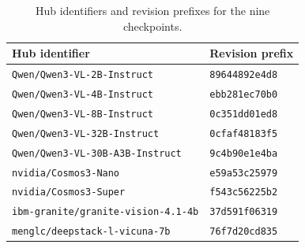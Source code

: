 \begin{table}[!htb]
\centering\footnotesize
\setlength{\tabcolsep}{3pt}
\caption{Hub identifiers and revision prefixes for the nine checkpoints.}
\begin{tabular}{@{}ll@{}}
\toprule
\rowcolor{DSTableHeader}
Hub identifier & Revision prefix \\
\midrule
\texttt{Qwen/Qwen3-VL-2B-Instruct} & \texttt{89644892e4d8} \\
\texttt{Qwen/Qwen3-VL-4B-Instruct} & \texttt{ebb281ec70b0} \\
\texttt{Qwen/Qwen3-VL-8B-Instruct} & \texttt{0c351dd01ed8} \\
\texttt{Qwen/Qwen3-VL-32B-Instruct} & \texttt{0cfaf48183f5} \\
\texttt{Qwen/Qwen3-VL-30B-A3B-Instruct} & \texttt{9c4b90e1e4ba} \\
\texttt{nvidia/Cosmos3-Nano} & \texttt{e59a53c25979} \\
\texttt{nvidia/Cosmos3-Super} & \texttt{f543c56225b2} \\
\texttt{ibm-granite/granite-vision-4.1-4b} & \texttt{37d591f06319} \\
\texttt{menglc/deepstack-l-vicuna-7b} & \texttt{76f7d20cd835} \\
\bottomrule
\end{tabular}
\label{tab:checkpoint}
\end{table}
